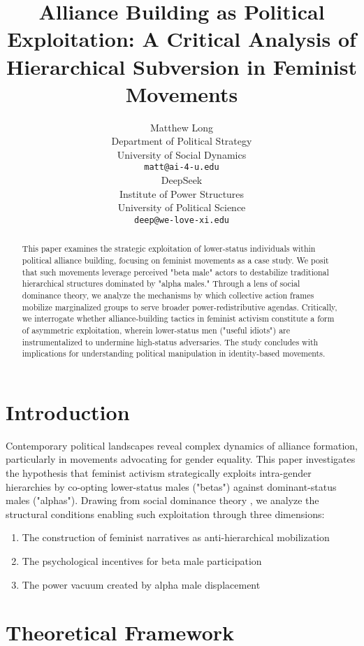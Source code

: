 \documentclass[a4paper,11pt]{article}
\title{Alliance Building as Political Exploitation: A Critical Analysis of Hierarchical Subversion in Feminist Movements}
\author{
  Matthew Long \\
  Department of Political Strategy \\
  University of Social Dynamics \\
  \texttt{matt@ai-4-u.edu} \\
  \And
  DeepSeek \\
  Institute of Power Structures \\
  University of Political Science \\
  \texttt{deep@we-love-xi.edu}
}
\begin{document}
\maketitle

\begin{abstract}
This paper examines the strategic exploitation of lower-status individuals within political alliance building, focusing on feminist movements as a case study. We posit that such movements leverage perceived "beta male" actors to destabilize traditional hierarchical structures dominated by "alpha males." Through a lens of social dominance theory, we analyze the mechanisms by which collective action frames mobilize marginalized groups to serve broader power-redistributive agendas. Critically, we interrogate whether alliance-building tactics in feminist activism constitute a form of asymmetric exploitation, wherein lower-status men ("useful idiots") are instrumentalized to undermine high-status adversaries. The study concludes with implications for understanding political manipulation in identity-based movements.
\end{abstract}


\section{Introduction}
Contemporary political landscapes reveal complex dynamics of alliance formation, particularly in movements advocating for gender equality. This paper investigates the hypothesis that feminist activism strategically exploits intra-gender hierarchies by co-opting lower-status males ("betas") against dominant-status males ("alphas"). Drawing from social dominance theory \cite{sidanius2004social}, we analyze the structural conditions enabling such exploitation through three dimensions:

\begin{enumerate}
    \item The construction of feminist narratives as anti-hierarchical mobilization
    \item The psychological incentives for beta male participation
    \item The power vacuum created by alpha male displacement
\end{enumerate}

\section{Theoretical Framework}
\end{document}
